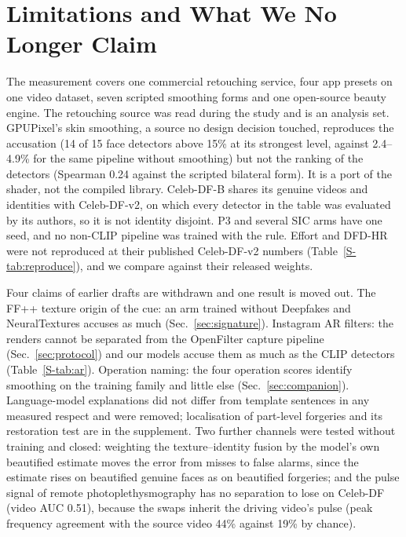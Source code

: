 \documentclass[conference]{IEEEtran}
\begin{document}
\section{Limitations and What We No Longer Claim}
\label{sec:limits}
The measurement covers one commercial retouching service, four app presets on one video dataset, seven scripted smoothing
forms and one open-source beauty engine. The retouching source was read during the study and is an analysis set. GPUPixel's
skin smoothing, a source no design decision touched, reproduces the accusation (14 of 15 face detectors above
15\% at its strongest level, against 2.4--4.9\% for the same pipeline without smoothing) but not the ranking of the detectors (Spearman
0.24 against the scripted bilateral form). It is a port of the shader, not the compiled library.
 Celeb-DF-B shares its genuine videos
and identities with Celeb-DF-v2, on which every detector in the table was evaluated by its authors, so it is not identity
disjoint. P3 and several SIC arms have one seed, and no non-CLIP pipeline was trained with the rule. Effort and DFD-HR were
not reproduced at their published Celeb-DF-v2 numbers (Table~\ref{S-tab:reproduce}), and we compare against their released
weights.

Four claims of earlier drafts are withdrawn and one result is moved out. The FF++ texture origin of the cue: an arm trained
without Deepfakes and NeuralTextures accuses as much (Sec.~\ref{sec:signature}). Instagram AR filters: the renders cannot be separated from the OpenFilter
capture pipeline (Sec.~\ref{sec:protocol}) and our models accuse them as much as the CLIP detectors (Table~\ref{S-tab:ar}).
Operation naming: the four operation scores identify smoothing on the training family and little else
(Sec.~\ref{sec:companion}). Language-model explanations did not differ from template sentences in any measured respect and
were removed; localisation of part-level forgeries and its restoration test are in the supplement.
Two further channels were tested without training and closed: weighting the texture--identity fusion by the model's own
beautified estimate moves the error from misses to false alarms, since the estimate rises on beautified genuine faces as on
beautified forgeries; and the pulse signal of remote photoplethysmography has no separation to lose on Celeb-DF (video AUC
0.51), because the swaps inherit the driving video's pulse (peak frequency agreement with the source video 44\% against
19\% by chance).
\end{document}
